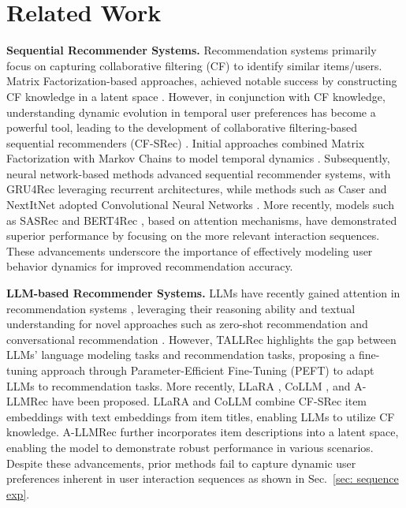 \section{Related Work}
\noindent\textbf{Sequential Recommender Systems. }
Recommendation systems primarily focus on capturing collaborative filtering (CF) to identify similar items/users. Matrix Factorization-based approaches, achieved notable success by constructing CF knowledge in a latent space \cite{mnih2007probabilistic, chaney2015probabilistic, he2017neural}. However, in conjunction with CF knowledge, understanding dynamic evolution in temporal user preferences has become a powerful tool, leading to the development of collaborative filtering-based sequential recommenders (CF-SRec) \cite{kang2018self, sun2019bert4rec, wu2019session, kim2023task, hidasi2015session,oh2023muse}.
Initial approaches combined Matrix Factorization with Markov Chains to model temporal dynamics \cite{rendle2010factorizing}. Subsequently, neural network-based methods advanced sequential recommender systems, with GRU4Rec \cite{hidasi2015session} leveraging recurrent architectures, while methods such as Caser \cite{tang2018personalized} and NextItNet \cite{yuan2019simple} adopted Convolutional Neural Networks \cite{krizhevsky2012imagenet}. More recently, models such as SASRec \cite{yuan2019simple} and BERT4Rec \cite{sun2019bert4rec}, based on attention mechanisms, have demonstrated superior performance by focusing on the more relevant interaction sequences. These advancements underscore the importance of effectively modeling user behavior dynamics for improved recommendation accuracy.

\smallskip
\noindent\textbf{LLM-based Recommender Systems. }
LLMs have recently gained attention in recommendation systems \cite{yue2023llamarec, harte2023leveraging, dai2023uncovering, wu2024coral}, leveraging their reasoning ability and textual understanding for novel approaches such as zero-shot recommendation \cite{hou2024large} and conversational recommendation \cite{sanner2023large}. However, TALLRec \cite{bao2023tallrec} highlights the gap between LLMs' language modeling tasks and recommendation tasks, proposing a fine-tuning approach through Parameter-Efficient Fine-Tuning (PEFT) to adapt LLMs to recommendation tasks.
More recently, LLaRA \cite{10.1145/3626772.3657690}, CoLLM \cite{zhang2023collm}, and A-LLMRec \cite{10.1145/3637528.3671931} have been proposed. LLaRA and CoLLM combine CF-SRec item embeddings with text embeddings from item titles, enabling LLMs to utilize CF knowledge. A-LLMRec further incorporates item descriptions into a latent space, enabling the model to demonstrate robust performance in various scenarios.
Despite these advancements, prior methods fail to capture dynamic user preferences inherent in user interaction sequences as shown in Sec.~\ref{sec: sequence exp}. 

